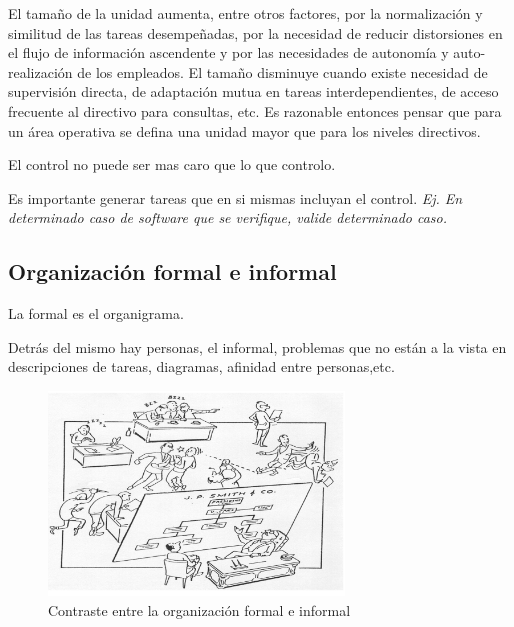 \documentclass[titlepage,a4paper]{article}
\begin{document}
El tamaño de la unidad aumenta, entre otros factores, por la normalización y similitud de las tareas desempeñadas, por la necesidad de reducir distorsiones en el flujo de información ascendente y por las necesidades de autonomía y auto-realización de los empleados. El tamaño disminuye cuando existe necesidad de supervisión directa, de adaptación mutua en tareas interdependientes, de acceso frecuente al directivo para consultas, etc. Es razonable entonces pensar que para un área operativa se defina una unidad mayor que para los niveles directivos.

El control no puede ser mas caro que lo que controlo.

Es importante generar tareas que en si mismas incluyan el control. \textit{Ej. En determinado caso de software que se verifique, valide determinado caso.}

\subsection{Organización formal e informal}
La formal es el organigrama.

Detrás del mismo hay personas, el informal, problemas que no están a la vista en descripciones de tareas, diagramas, afinidad entre personas,etc.

\begin{figure}[!htb]
    \centering
    \includegraphics[width=0.7\textwidth]{imagenes/OrganizacionFormalInformal.PNG}
    \caption{Contraste entre la organización formal e informal}
\end{figure}
\end{document}
